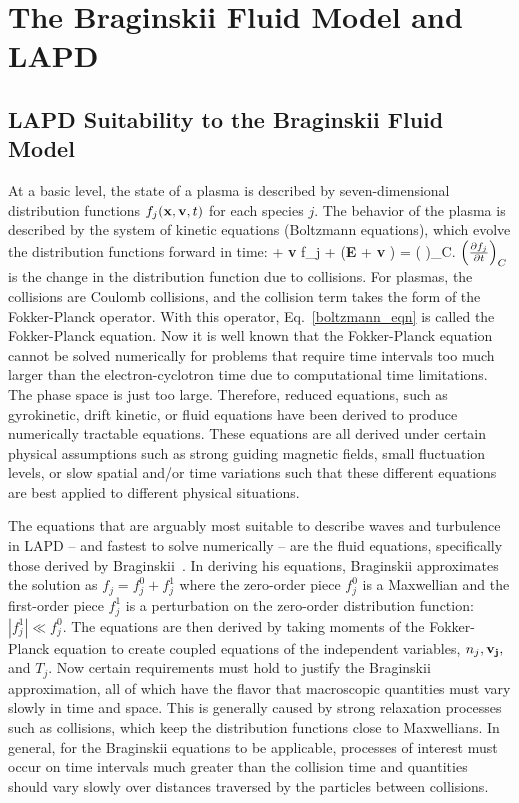 \chapter{The Braginskii Fluid Model and LAPD}
\label{c_braginskii}

\section{LAPD Suitability to the Braginskii Fluid Model}
\label{s_lapd_suitability}

At a basic level, the state of a plasma is described by seven-dimensional distribution functions $f_j({\bf{x}},{\bf v},t)$ for each species $j$. The behavior of the plasma
is described by the system of kinetic equations (Boltzmann equations), which evolve the distribution functions forward in time:
\beq
\label{boltzmann_eqn}
 + {\bf v} \cdot \grad f_j +  ({\bf E} + {\bf v} ) \cdot {} = \left( \right)_C.
\eeq
$\left(\frac{\partial f_j}{\partial t} \right)_C$ is the change in the distribution function due to collisions. For plasmas, the collisions are Coulomb collisions, and the collision term takes the form of 
the Fokker-Planck operator. With this operator, Eq.~\ref{boltzmann_eqn} is called the Fokker-Planck equation. Now it is well known that the Fokker-Planck equation cannot be solved
numerically for problems that require time intervals too much larger than the electron-cyclotron time due to computational time limitations. The phase space is just too large. Therefore,
reduced equations, such as gyrokinetic, drift kinetic, or fluid equations have been derived to produce numerically tractable equations. 
These equations are all derived under certain physical assumptions such as strong guiding magnetic fields, small fluctuation levels, 
or slow spatial and/or time variations such that these different equations are best applied to different physical situations.

The equations that are arguably most suitable to describe waves and turbulence in LAPD -- and fastest to solve numerically -- are the fluid equations, 
specifically those derived by Braginskii~\cite{Braginskii1965}.
In deriving his equations, Braginskii approximates the solution as $f_j = f_j^0 + f_j^1$ where the zero-order piece $f_j^0$ is a Maxwellian and the first-order piece $f_j^1$ is a perturbation on the
zero-order distribution function: $|f_j^1| \ll f_j^0$. The equations are then derived by taking moments of the Fokker-Planck equation to create coupled equations of the independent variables,
$n_j, {\bf v_j},$ and $T_j$. Now certain requirements must hold to justify the Braginskii approximation, all of which have the flavor that macroscopic quantities must vary slowly in time and space.
This is generally caused by strong relaxation processes such as collisions, which keep the distribution functions close to Maxwellians. In general, for the Braginskii equations to be applicable,
processes of interest must occur on time intervals much greater than the collision time and quantities should vary slowly over distances traversed by the particles between collisions.

